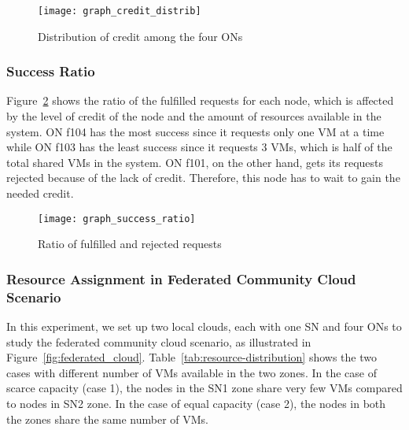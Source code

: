 \begin{figure}[tbp]
	\centering
		\texttt{[image: graph\_credit\_distrib]}
		\caption{Distribution of credit among the four ONs}
		\label{fig:credit-distrib-graphs}
\end{figure}


\subsubsection{Success Ratio}

Figure~\ref{fig:success-ratio-graphs} shows the ratio of the fulfilled requests for each node, which is affected by the level of credit of the node and the amount of resources available in the system.
ON f104 has the most success since it requests only one VM at a time while ON f103 has the least success since it requests 3 VMs, which is half of the total shared VMs in the system. 
ON f101, on the other hand, gets its requests rejected because of the lack of credit. 
Therefore, this node has to wait to gain the needed credit.


\begin{figure}[tbp]
	\centering
	\texttt{[image: graph\_success\_ratio]}
	\caption{Ratio of fulfilled and rejected requests}
	\label{fig:success-ratio-graphs}
\end{figure}


\subsubsection{Resource Assignment in Federated Community Cloud Scenario}
\label{sec:resource-assign-federated}

In this experiment, we set up two local clouds, each with one SN and four ONs to study the federated community cloud scenario, as illustrated in Figure~\ref{fig:federated_cloud}.  
Table~\ref{tab:resource-distribution} shows the two cases with different number of VMs available in the two zones.
In the case of scarce capacity (case 1), the nodes in the SN1 zone share very few VMs compared to nodes in SN2 zone.
In the case of equal capacity (case 2), the nodes in both the zones share the same number of VMs.

